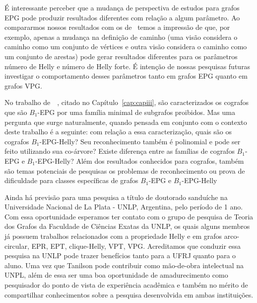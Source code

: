 É interessante perceber que a mudança de perspectiva de estudos para grafos EPG pode produzir resultados diferentes com relação a algum parâmetro. Ao compararmos nossos resultados com os de~\cite{golumbic2013} temos a impressão de que, por exemplo, apenas a mudança na definição de caminho (uma visão considera o caminho como um conjunto de vértices e outra visão considera o caminho como um conjunto de arestas) pode gerar resultados diferentes para os parâmetros número de Helly e número de Helly forte. É intenção de nossas pesquisas futuras investigar o comportamento desses parâmetros tanto em grafos EPG quanto em grafos VPG.

No trabalho de~\citeauthor{cohen2014}~\cite{cohen2014}, citado no Capítulo~\ref{cap:capiii}, são caracterizados os cografos que são $B_1$-EPG por uma família minimal de subgrafos proibidos. Mas uma pergunta que surge naturalmente, quando pensada em conjunto com o contexto deste trabalho é a seguinte: com relação a essa caracterização, quais são os cografos $B_1$-EPG-Helly? Seu reconhecimento também é polinomial e pode ser feito utilizando sua co-árvore? Existe diferença entre as famílias de cografos $B_1$-EPG e $B_1$-EPG-Helly? 
Além dos resultados conhecidos para cografos, também são temas potenciais de pesquisas os problemas de reconhecimento ou prova de dificuldade para classes específicas de grafos $B_1$-EPG e $B_1$-EPG-Helly
 

Ainda há previsão para uma pesquisa a título de doutorado sanduíche na Universidade Nacional de La Plata - UNLP, Argentina, pelo período de 1 ano. Com essa oportunidade esperamos ter contato com o grupo de pesquisa de Teoria dos Grafos da Faculdade de Ciências Exatas da UNLP, os quais alguns membros já possuem trabalhos relacionados com a propriedade Helly e em grafos arco-circular, EPR, EPT, clique-Helly, VPT, VPG. Acreditamos que conduzir essa pesquisa na UNLP pode trazer benefícios tanto para a UFRJ quanto para o aluno. Uma vez que Tanilson pode contribuir como mão-de-obra intelectual na UNPL, além de essa ser uma boa oportunidade de amadurecimento como pesquisador do ponto de vista de experiência acadêmica e também no mérito de compartilhar conhecimentos sobre a pesquisa desenvolvida em ambas instituições. 

